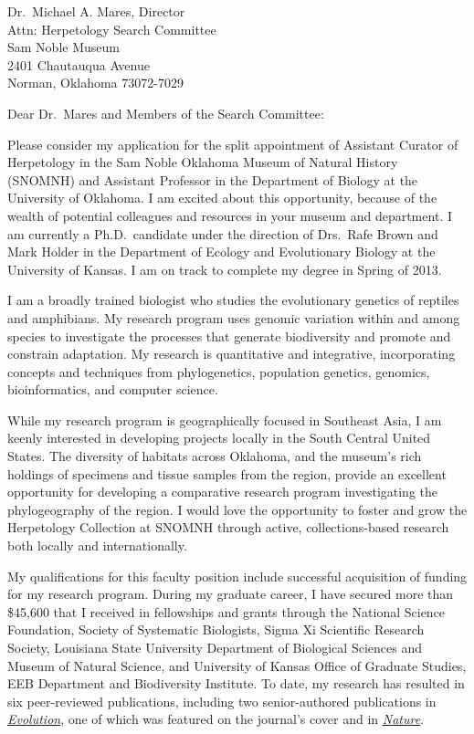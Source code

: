 \documentclass[letterpaper, 10pt]{letter}
\begin{document}
\begin{letter}{Dr.\ Michael A. Mares, Director \\
                     Attn: Herpetology Search Committee \\
                     Sam Noble Museum \\
                     2401 Chautauqua Avenue \\
                     Norman, Oklahoma 73072-7029}
\opening{Dear Dr.\ Mares and Members of the Search Committee:}
\raggedright
Please consider my application for the split appointment of Assistant Curator
of Herpetology in the Sam Noble Oklahoma Museum of Natural History (SNOMNH) and
Assistant Professor in the Department of Biology at the University of Oklahoma.
I am excited about this opportunity, because of the wealth of potential
colleagues and resources in your museum and department.
I am currently a Ph.D.\ candidate under the direction of Drs.\ Rafe Brown and
Mark Holder in the Department of Ecology and Evolutionary Biology at the
University of Kansas.
I am on track to complete my degree in Spring of 2013.

I am a broadly trained biologist who studies the evolutionary genetics of
reptiles and amphibians.
My research program uses genomic variation within and among species to
investigate the processes that generate biodiversity and promote and constrain
adaptation.
My research is quantitative and integrative, incorporating concepts and
techniques from phylogenetics, population genetics, genomics, bioinformatics,
and computer science.

While my research program is geographically focused in Southeast Asia, I am
keenly interested in developing projects locally in the South Central United
States.
The diversity of habitats across Oklahoma, and the museum's rich holdings of
specimens and tissue samples from the region, provide an excellent opportunity
for developing a comparative research program investigating the phylogeography
of the region.
I would love the opportunity to foster and grow the Herpetology Collection at
SNOMNH through active, collections-based research both locally and
internationally.

My qualifications for this faculty position include successful acquisition of
funding for my research program.
During my graduate career, I have secured more than \$45,600 that I received in
fellowships and grants through the 
National Science Foundation,
Society of Systematic Biologists,
Sigma Xi Scientific Research Society,
Louisiana State University Department of Biological Sciences and Museum of
Natural Science,
and University of Kansas Office of Graduate Studies, EEB Department and
Biodiversity Institute.
To date, my research has resulted in six peer-reviewed publications, including
two senior-authored publications in
\href{http://onlinelibrary.wiley.com/doi/10.1111/j.1558-5646.2011.01373.x/abstract}{\it
Evolution}, one of which was featured on the journal's cover and in
\href{http://www.nature.com/nature/journal/v474/n7353/full/474545a.html}{\it
Nature}. 


\end{letter}
\end{document}
